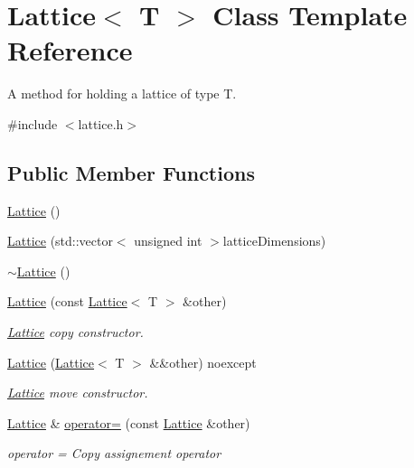 \hypertarget{class_lattice}{}\section{Lattice$<$ T $>$ Class Template Reference}
\label{class_lattice}


A method for holding a lattice of type T.  




{\ttfamily \#include $<$lattice.\+h$>$}

\subsection*{Public Member Functions}
\begin{DoxyCompactItemize}
\item 
\mbox{\hyperlink{class_lattice_ac32e6300cc5ebc246a060cd67d99f370}{Lattice}} ()
\item 
\mbox{\hyperlink{class_lattice_a0c212e4f17842acee8697ce79eef3dff}{Lattice}} (std\+::vector$<$ unsigned int $>$lattice\+Dimensions)
\item 
\mbox{\hyperlink{class_lattice_a006bd75dd4c599fe17f8ca7e96413487}{$\sim$\+Lattice}} ()
\item 
\mbox{\hyperlink{class_lattice_a74cc98beb36f76dcfa27535e43528d57}{Lattice}} (const \mbox{\hyperlink{class_lattice}{Lattice}}$<$ T $>$ \&other)
\begin{DoxyCompactList}\small\item\em \mbox{\hyperlink{class_lattice}{Lattice}} copy constructor. \end{DoxyCompactList}\item 
\mbox{\hyperlink{class_lattice_ad2826da8e42dcaea917b9a2e50ca1ca2}{Lattice}} (\mbox{\hyperlink{class_lattice}{Lattice}}$<$ T $>$ \&\&other) noexcept
\begin{DoxyCompactList}\small\item\em \mbox{\hyperlink{class_lattice}{Lattice}} move constructor. \end{DoxyCompactList}\item 
\mbox{\hyperlink{class_lattice}{Lattice}} \& \mbox{\hyperlink{class_lattice_acc09c6b9abeafc6b735c3b95d8537edf}{operator=}} (const \mbox{\hyperlink{class_lattice}{Lattice}} \&other)
\begin{DoxyCompactList}\small\item\em operator = Copy assignement operator \end{DoxyCompactList}\item 

\end{DoxyCompactItemize}
